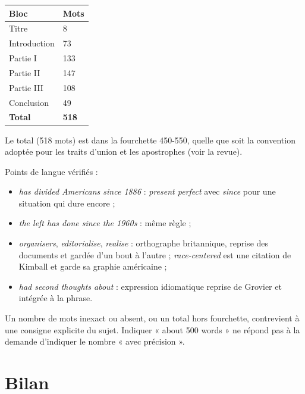 \documentclass[11pt,a4paper]{article}
\providecommand{\tightlist}{\setlength{\itemsep}{0pt}\setlength{\parskip}{0pt}}
\begin{document}
\begin{longtable}[]{@{}ll@{}}
\toprule\noalign{}
Bloc & Mots \\
\midrule\noalign{}
\endhead
\bottomrule\noalign{}
\endlastfoot
Titre & 8 \\
Introduction & 73 \\
Partie I & 133 \\
Partie II & 147 \\
Partie III & 108 \\
Conclusion & 49 \\
\textbf{Total} & \textbf{518} \\
\end{longtable}

Le total (518 mots) est dans la fourchette 450-550, quelle que soit la convention adoptée pour les traits d'union et les apostrophes (voir la revue).

Points de langue vérifiés :

\begin{itemize}
\tightlist
\item
  \emph{has divided Americans since 1886} : \emph{present perfect} avec \emph{since} pour une situation qui dure encore ;
\item
  \emph{the left has done since the 1960s} : même règle ;
\item
  \emph{organisers}, \emph{editorialise}, \emph{realise} : orthographe britannique, reprise des documents et gardée d'un bout à l'autre ; \emph{race-centered} est une citation de Kimball et garde sa graphie américaine ;
\item
  \emph{had second thoughts about} : expression idiomatique reprise de Grovier et intégrée à la phrase.
\end{itemize}

\begin{piege}

Un nombre de mots inexact ou absent, ou un total hors fourchette, contrevient à une consigne explicite du sujet. Indiquer « about 500 words » ne répond pas à la demande d'indiquer le nombre « avec précision ».

\end{piege}

\hypertarget{bilan}{%
\section{Bilan}\label{bilan}}
\end{document}
